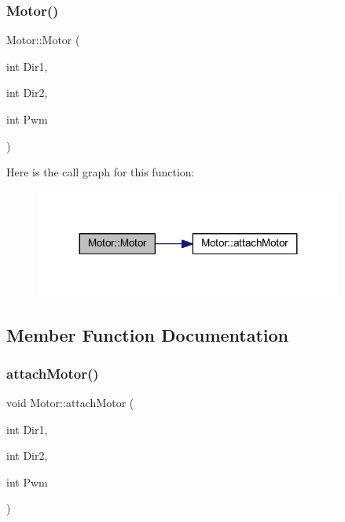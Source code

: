 \subsubsection{\texorpdfstring{Motor()}{Motor()}\hspace{0.1cm}{\footnotesize\ttfamily [2/2]}}
{\footnotesize\ttfamily Motor\+::\+Motor (\begin{DoxyParamCaption}\item[{int}]{Dir1,  }\item[{int}]{Dir2,  }\item[{int}]{Pwm }\end{DoxyParamCaption})}

Here is the call graph for this function\+:
\nopagebreak
\begin{figure}[H]
\begin{center}
\leavevmode
\includegraphics[width=287pt]{d1/d6b/class_motor_af7bad7a60264d47a368216d72704d838_cgraph}
\end{center}
\end{figure}


\subsection{Member Function Documentation}
\mbox{\label{class_motor_a6726cda4183f9b9f4fd3d8af52d9e87d}} 
\subsubsection{\texorpdfstring{attach\+Motor()}{attachMotor()}}
{\footnotesize\ttfamily void Motor\+::attach\+Motor (\begin{DoxyParamCaption}\item[{int}]{Dir1,  }\item[{int}]{Dir2,  }\item[{int}]{Pwm }\end{DoxyParamCaption})}

